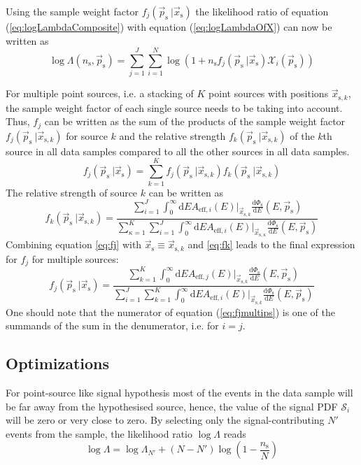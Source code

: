 \documentclass{article}
\newcommand{\eq}[1]{(\ref{#1})}
\newcommand{\ns}{n_{\mathrm{s}}}
\newcommand{\ps}{\vec{p}_{\mathrm{s}}}
\newcommand{\xs}{\vec{x}_{\mathrm{s}}}
\newcommand{\dPhisdE}{\frac{\mathrm{d}\Phi_{\mathrm{s}}}{\mathrm{d}E}}
\begin{document}
Using the sample weight factor $f_{j}(\ps~|\xs)$ the likelihood ratio of
equation \eq{eq:logLambdaComposite} with equation \eq{eq:logLambdaOfX} can now
be written as
\begin{equation}
 \log \Lambda(\ns,\ps) = \sum_{j=1}^{J} \sum_{i=1}^{N} \log (1 + \ns f_{j}(\ps~|\xs)\mathcal{X}_i(\ps))
\end{equation}


For multiple point sources, i.e. a stacking of $K$ point sources with positions
$\vec{x}_{\mathrm{s},k}$, the sample weight factor of each single source needs
to be taking into account. Thus, $f_{j}$ can be written as the sum of the
products of the sample weight factor $f_{j}(\ps~|\vec{x}_{\mathrm{s},k})$ for
source $k$ and the relative strength $f_{k}(\ps~|\vec{x}_{\mathrm{s},k})$ of the
$k$th source in all data samples compared to all the other sources in all data
samples.
\begin{equation}
 f_{j}(\ps~|\xs) = \sum_{k=1}^{K} f_{j}(\ps~|\vec{x}_{\mathrm{s},k}) f_{k}(\ps~|\vec{x}_{\mathrm{s},k})
\end{equation}
The relative strength of source $k$ can be written as
\begin{equation}
 f_{k}(\ps~|\vec{x}_{\mathrm{s},k}) =
    \frac{\sum_{i=1}^{J} \int_0^\infty \mathrm{d}E A_{\mathrm{eff},i}(E)|_{\vec{x}_{\mathrm{s},k}} \dPhisdE(E,\ps)}
         {\sum_{\kappa=1}^{K} \sum_{i=1}^{J} \int_0^\infty \mathrm{d}E A_{\mathrm{eff},i}(E)|_{\vec{x}_{\mathrm{s},\kappa}} \dPhisdE(E,\ps) }
 \label{eq:fk}
\end{equation}
Combining equation \ref{eq:fj} with $\xs \equiv \vec{x}_{\mathrm{s},k}$ and
\ref{eq:fk} leads to the final expression for $f_{j}$ for multiple sources:
\begin{equation}
 f_{j}(\ps~|\xs) = \frac{\sum_{k=1}^{K} \int_0^\infty \mathrm{d}E A_{\mathrm{eff},j}(E)|_{\vec{x}_{\mathrm{s},k}} \dPhisdE(E,\ps) }
                        {\sum_{i=1}^{J} \sum_{k=1}^{K} \int_0^\infty \mathrm{d}E A_{\mathrm{eff},i}(E)|_{\vec{x}_{\mathrm{s},k}} \dPhisdE(E,\ps) }
 \label{eq:fjmultips}
\end{equation}
One should note that the numerator of equation \eq{eq:fjmultips} is one of the
summands of the sum in the denumerator, i.e. for $i=j$.

\subsection{Optimizations}

For point-source like signal hypothesis most of the events in the data sample
will be far away from the hypothesised source, hence, the value of the
signal PDF $\mathcal{S}_i$ will be zero or very close to zero. By selecting only
the signal-contributing $N'$ events from the sample, the likelihood ratio
$\log \Lambda$ reads
\begin{equation}
 \log \Lambda = \log \Lambda_{N'} + (N - N')\log(1 - \frac{\ns}{N})
\end{equation}
\end{document}
